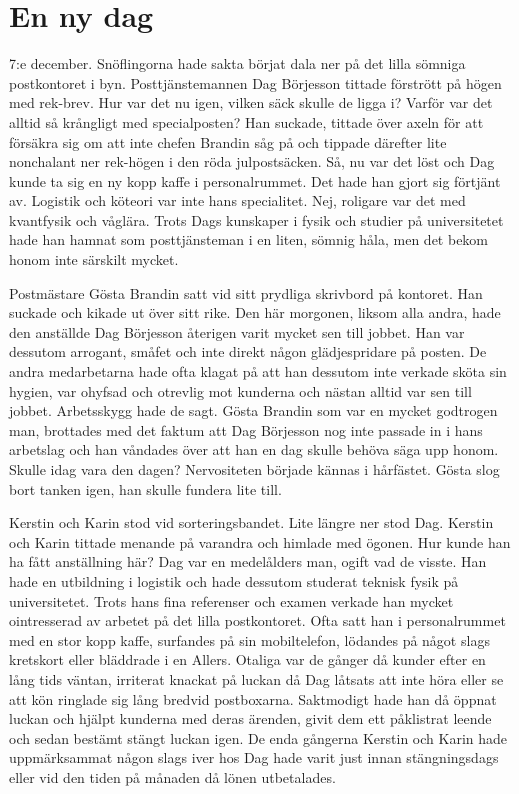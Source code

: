 \chapter[ennydag]{En ny dag}

7:e december. Snöflingorna hade sakta börjat dala ner på det lilla sömniga postkontoret i byn. Posttjänstemannen Dag Börjesson tittade förstrött på högen med rek-brev. Hur var det nu igen, vilken säck skulle de ligga i? Varför var det alltid så krångligt med specialposten? Han suckade, tittade över axeln för att försäkra sig om att inte chefen Brandin såg på och tippade därefter lite nonchalant ner rek-högen i den röda julpostsäcken. Så, nu var det löst och Dag kunde ta sig en ny kopp kaffe i personalrummet. Det hade han gjort sig förtjänt av. Logistik och köteori var inte hans specialitet. Nej, roligare var det med kvantfysik och våglära. Trots Dags kunskaper i fysik och studier på universitetet hade han hamnat som posttjänsteman i en liten, sömnig håla, men det bekom honom inte särskilt mycket. 

Postmästare Gösta Brandin satt vid sitt prydliga skrivbord på kontoret. Han suckade och kikade ut över sitt rike. Den här morgonen, liksom alla andra, hade den anställde Dag Börjesson återigen varit mycket sen till jobbet. Han var dessutom arrogant, småfet och inte direkt någon glädjespridare på posten. De andra medarbetarna hade ofta klagat på att han dessutom inte verkade sköta sin hygien, var ohyfsad och otrevlig mot kunderna och nästan alltid var sen till jobbet. Arbetsskygg hade de sagt. Gösta Brandin som var en mycket godtrogen man, brottades med det faktum att Dag Börjesson nog inte passade in i hans arbetslag och han våndades över att han en dag skulle behöva säga upp honom. Skulle idag vara den dagen? Nervositeten började kännas i hårfästet. Gösta slog bort tanken igen, han skulle fundera lite till. 

Kerstin och Karin stod vid sorteringsbandet. Lite längre ner stod Dag. Kerstin och Karin tittade menande på varandra och himlade med ögonen. Hur kunde han ha fått anställning här? Dag var en medelålders man, ogift vad de visste. Han hade en utbildning i logistik och hade dessutom studerat teknisk fysik på universitetet. Trots hans fina referenser och examen verkade han mycket ointresserad av arbetet på det lilla postkontoret. Ofta satt han i personalrummet med en stor kopp kaffe, surfandes på sin mobiltelefon, lödandes på något slags kretskort eller bläddrade i en Allers. Otaliga var de gånger då kunder efter en lång tids väntan, irriterat knackat på luckan då Dag låtsats att inte höra eller se att kön ringlade sig lång bredvid postboxarna. Saktmodigt hade han då öppnat luckan och hjälpt kunderna med deras ärenden, givit dem ett påklistrat leende och sedan bestämt stängt luckan igen. De enda gångerna Kerstin och Karin hade uppmärksammat någon slags iver hos Dag hade varit just innan stängningsdags eller vid den tiden på månaden då lönen utbetalades.

